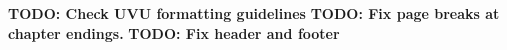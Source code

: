 \documentclass[letterpaper, 11pt, openany, notitlepage]{report}
\begin{document}

\textbf{TODO: Check UVU formatting guidelines}
\textbf{TODO: Fix page breaks at chapter endings.}
\textbf{TODO: Fix header and footer}


\tableofcontents
\listoftables
\listoffigures

\newpage

\pagestyle{fancy}

\begin{multicols}{2}










%



\end{multicols}
\newpage
\appendix


\printbibliography[title=References,heading=bibintoc]



%
\end{document}
